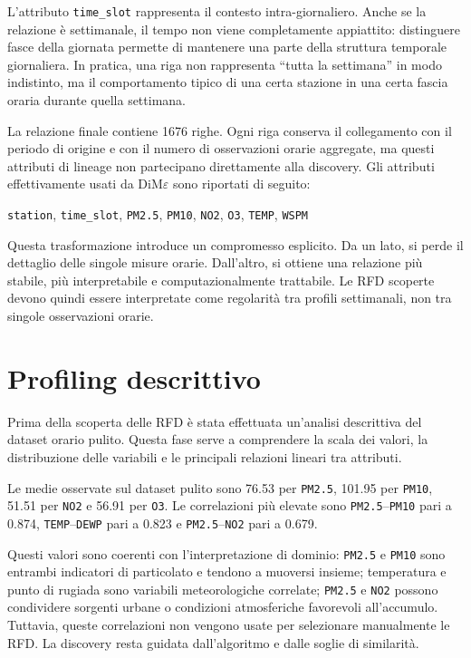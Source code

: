 \documentclass[a4paper,12pt]{article}
\newcommand{\Dime}{DiM\ensuremath{\varepsilon}}
\newcommand{\PMdue}{\texttt{PM2.5}}
\newcommand{\PMdieci}{\texttt{PM10}}
\newcommand{\NOdue}{\texttt{NO2}}
\newcommand{\Otre}{\texttt{O3}}
\newcommand{\Temp}{\texttt{TEMP}}
\newcommand{\Wspm}{\texttt{WSPM}}
\newcommand{\TimeSlot}{\texttt{time\_slot}}
\begin{document}
L'attributo \TimeSlot{} rappresenta il contesto intra-giornaliero. Anche se la relazione è settimanale, il tempo non viene completamente appiattito: distinguere fasce della giornata permette di mantenere una parte della struttura temporale giornaliera. In pratica, una riga non rappresenta ``tutta la settimana'' in modo indistinto, ma il comportamento tipico di una certa stazione in una certa fascia oraria durante quella settimana.

La relazione finale contiene 1676 righe. Ogni riga conserva il collegamento con il periodo di origine e con il numero di osservazioni orarie aggregate, ma questi attributi di lineage non partecipano direttamente alla discovery. Gli attributi effettivamente usati da \Dime{} sono riportati di seguito:

\begin{center}
\texttt{station}, \TimeSlot, \PMdue, \PMdieci, \NOdue, \Otre, \Temp, \Wspm
\end{center}

Questa trasformazione introduce un compromesso esplicito. Da un lato, si perde il dettaglio delle singole misure orarie. Dall'altro, si ottiene una relazione più stabile, più interpretabile e computazionalmente trattabile. Le RFD scoperte devono quindi essere interpretate come regolarità tra profili settimanali, non tra singole osservazioni orarie.

\section{Profiling descrittivo}

Prima della scoperta delle RFD è stata effettuata un'analisi descrittiva del dataset orario pulito. Questa fase serve a comprendere la scala dei valori, la distribuzione delle variabili e le principali relazioni lineari tra attributi.

Le medie osservate sul dataset pulito sono 76.53 per \PMdue, 101.95 per \PMdieci, 51.51 per \NOdue{} e 56.91 per \Otre. Le correlazioni più elevate sono \PMdue--\PMdieci{} pari a 0.874, \Temp--\texttt{DEWP} pari a 0.823 e \PMdue--\NOdue{} pari a 0.679.

Questi valori sono coerenti con l'interpretazione di dominio: \PMdue{} e \PMdieci{} sono entrambi indicatori di particolato e tendono a muoversi insieme; temperatura e punto di rugiada sono variabili meteorologiche correlate; \PMdue{} e \NOdue{} possono condividere sorgenti urbane o condizioni atmosferiche favorevoli all'accumulo. Tuttavia, queste correlazioni non vengono usate per selezionare manualmente le RFD. La discovery resta guidata dall'algoritmo e dalle soglie di similarità.
\end{document}

